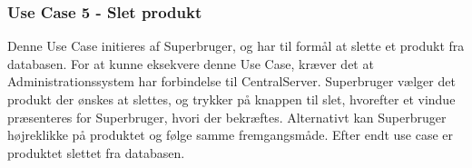 \subsubsection{Use Case 5 - Slet produkt}
Denne Use Case initieres af Superbruger, og har til formål at slette et produkt fra databasen. For at kunne eksekvere denne Use Case, kræver det at Administrationssystem har forbindelse til CentralServer. Superbruger vælger det produkt der ønskes at slettes, og trykker på knappen til slet, hvorefter et vindue præsenteres for Superbruger, hvori der bekræftes. Alternativt kan Superbruger højreklikke på produktet og følge samme fremgangsmåde. Efter endt use case er produktet slettet fra databasen.